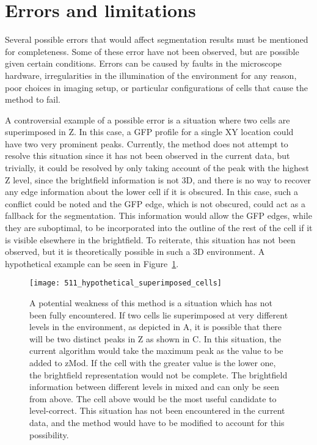 \section{Errors and limitations}
\label{sec:errors}

Several possible errors that would affect segmentation results must be mentioned for completeness. Some of these error have not been observed, but are possible given certain conditions. Errors can be caused by faults in the microscope hardware, irregularities in the illumination of the environment for any reason, poor choices in imaging setup, or particular configurations of cells that cause the method to fail.

A controversial example of a possible error is a situation where two cells are superimposed in Z. In this case, a GFP profile for a single XY location could have two very prominent peaks. Currently, the method does not attempt to resolve this situation since it has not been observed in the current data, but trivially, it could be resolved by only taking account of the peak with the highest Z level, since the brightfield information is not 3D, and there is no way to recover any edge information about the lower cell if it is obscured. In this case, such a conflict could be noted and the GFP edge, which is not obscured, could act as a fallback for the segmentation. This information would allow the GFP edges, while they are suboptimal, to be incorporated into the outline of the rest of the cell if it is visible elsewhere in the brightfield. To reiterate, this situation has not been observed, but it is theoretically possible in such a 3D environment. A hypothetical example can be seen in Figure~\ref{fig:superimposedcells}.

\begin{figure}[h!]
 \centering
 \texttt{[image: 511\_hypothetical\_superimposed\_cells]}
 \caption[Unaccounted for: superimposed cells]{
 	A potential weakness of this method is a situation which has not been fully encountered. If two cells lie superimposed at very different levels in the environment, as depicted in A, it is possible that there will be two distinct peaks in Z as shown in C. In this situation, the current algorithm would take the maximum peak as the value to be added to zMod. If the cell with the greater value is the lower one, the brightfield representation would not be complete. The brightfield information between different levels in mixed and can only be seen from above. The cell above would be the most useful candidate to level-correct. This situation has not been encountered in the current data, and the method would have to be modified to account for this possibility.
 }
 \label{fig:superimposedcells}
\end{figure}

